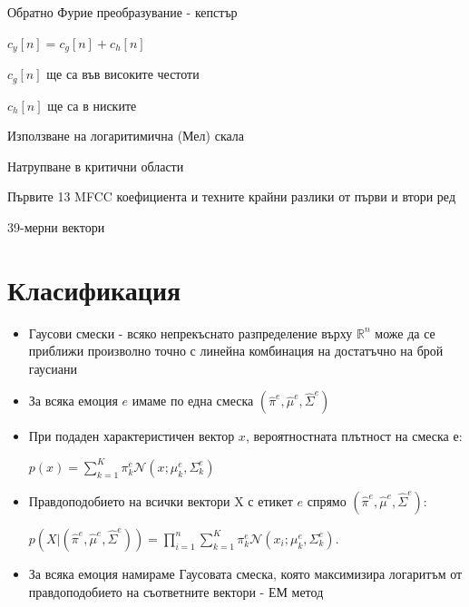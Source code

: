 \documentclass[9pt]{beamer}
\begin{document}
\begin{frame}[t]
\begin{itemize}
{\begin{columns}
\begin{column}{0.48\textwidth}
                    \end{column}
                \end{columns}
        }
         {
            \item<5-12> Обратно Фурие преобразувание - кепстър
            \item<6-12> $c_y[n] = c_g[n] + c_h[n]$
            \item<7-12> $c_g[n]$ ще са във високите честоти
            \item<8-12> $c_h[n]$ ще са в ниските
            \item<9-12> Използване на логаритимична (Мел) скала
            \item<10-12> Натрупване в критични области
            \item<11-12> Първите 13 MFCC коефициента и техните крайни разлики от първи и втори ред
            \item<12-12> 39-мерни вектори
            }
    \end{itemize}
\end{frame}

\section{Класификация}
\begin{frame}[t]
    \begin{itemize}
        \item Гаусови смески
        \pause - всяко непрекъснато разпределение върху $\mathbb{R}^{n}$ може да се приближи произволно точно с линейна комбинация на достатъчно на брой гаусиани
        \pause
        \item За всяка емоция $e$ имаме по една смеска $(\hat{\pi}^e, \hat{\mu}^e, \hat{\Sigma}^e)$
        \pause
        \item При подаден характеристичен вектор $x$, вероятностната плътност на смеска е:
        \pause

        $p(x) = \sum\limits_{k=1}^{K} \pi_k^e \mathcal{N}(x; \mu_k^e, \Sigma_k^e)$
        \pause
        \item Правдоподобието на всички вектори X с етикет $e$ спрямо $(\hat{\pi}^e, \hat{\mu}^e, \hat{\Sigma}^e)$:
        \pause    
    
        $p(X|(\hat{\pi}^e, \hat{\mu}^e, \hat{\Sigma}^e)) = \prod\limits_{i=1}^{n} \sum\limits_{k=1}^{K} \pi_k^e \mathcal{N}(x_i; \mu_k^e, \Sigma_k^e)$.
        \pause
        \item За всяка емоция намираме Гаусовата смеска, която максимизира логаритъм от правдоподобието на съответните вектори
        \pause - ЕМ метод
    \end{itemize}
\end{frame}
\end{document}
